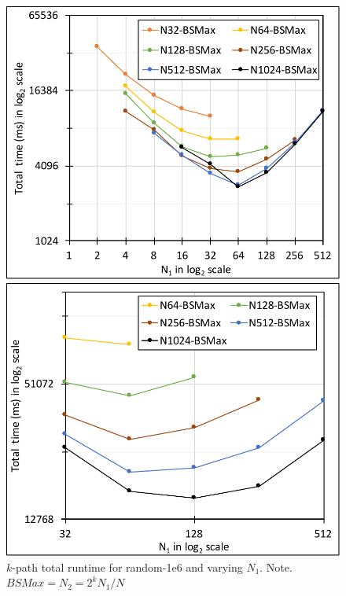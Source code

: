 \begin{figure}[!htb]
    \centering
    \begin{minipage}{0.32\textwidth}
        \centering        
        \includegraphics[width=1\columnwidth]{img/kpath-N1N/fig-perf-kpath-1mil-k6-bsmax.pdf}
        \caption{$k$-path total runtime for random-1e6 and varying $N_1$. Note. $BSMax=N_2=2^kN_1/N$}
        \label{fig:fig-perf-kpath-1mil-k6-bsmax.pdf}
    \end{minipage}
    \hspace{0mm}
    \begin{minipage}{0.32\textwidth}
        \centering
        \includegraphics[width=1\columnwidth]{img/kpath-N1N/fig-perf-kpath-orkut-k6-bsmax.pdf}

\end{minipage}
\end{figure}

